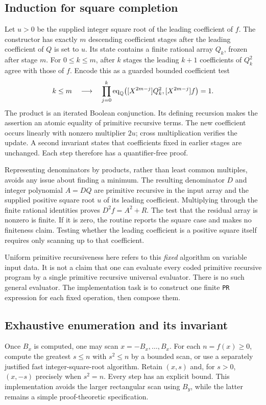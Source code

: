 \subsection{Induction for square completion}

Let $u>0$ be the supplied integer square root of the leading coefficient
of $f$. The constructor has exactly $m$ descending coefficient stages
after the leading coefficient of $Q$ is set to $u$. Its state contains
a finite rational array $Q_k$, frozen after stage $m$. For $0\le k\le m$,
after $k$ stages the leading $k+1$ coefficients of $Q_k^2$ agree with
those of $f$. Encode this as a guarded bounded coefficient test
\[
 k\le m\quad\longrightarrow\quad
 \prod_{j=0}^{k}
  \operatorname{eq}_{\mathbb Q}\bigl([X^{2m-j}]Q_k^2,
                              [X^{2m-j}]f\bigr)=1.
\]
The product is an iterated Boolean conjunction. Its defining recursion
makes the assertion an atomic equality of primitive recursive terms.
The new coefficient occurs linearly with nonzero multiplier $2u$;
cross multiplication verifies the update. A second invariant states
that coefficients fixed in earlier stages are unchanged. Each step
therefore has a quantifier-free proof.

Representing denominators by products, rather than least common
multiples, avoids any issue about finding a minimum. The resulting
denominator $D$ and integer polynomial $A=DQ$ are primitive recursive
in the input array and the supplied positive square root $u$ of its
leading coefficient. Multiplying through the finite rational identities
proves $D^2f=A^2+R$. The test that the residual array is nonzero is
finite. If it is zero, the routine reports the square case and makes
no finiteness claim. Testing whether the leading coefficient is a
positive square itself requires only scanning up to that coefficient.

Uniform primitive recursiveness here refers to this \emph{fixed}
algorithm on variable input data. It is not a claim that one can
evaluate every coded primitive recursive program by a single primitive
recursive universal evaluator. There is no such general evaluator.
The implementation task is to construct one finite \texttt{PR} expression
for each fixed operation, then compose them.

\subsection{Exhaustive enumeration and its invariant}

Once $B_x$ is computed, one may scan $x=-B_x,\ldots,B_x$. For each
$n=f(x)\ge0$, compute the greatest $s\le n$ with $s^2\le n$ by a
bounded scan, or use a separately justified fast integer-square-root
algorithm. Retain $(x,s)$ and, for $s>0$, $(x,-s)$ precisely when
$s^2=n$. Every step has an explicit bound. This implementation avoids
the larger rectangular scan using $B_y$, while the latter remains a
simple proof-theoretic specification.


